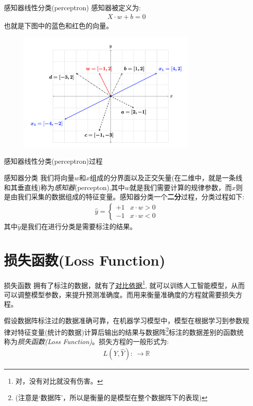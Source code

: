 \documentclass[handout]{ctexbeamer}
\newcommand{\rn}{\mathbb{R}}
\begin{document}
\begin{frame}{感知器线性分类(perceptron)}
感知器被定义为:
\begin{align*}
	X \cdot w + b = 0
\end{align*}	
也就是下图中的蓝色和红色的向量。
\begin{figure}[H]
	\centering
	\includegraphics[width=0.8\textwidth]{fig/C2C2dotprodt}
\end{figure}	
\end{frame}

\begin{frame}{感知器线性分类(perceptron)过程}
	\begin{block}{感知器分类}
	我们将向量$w$和$x$组成的分界面以及正交矢量(在二维中，就是一条线和其垂直线)称为\textit{感知器}(percepton),其中$w$就是我们需要计算的规律参数，而$x$则是由我们采集的数据组成的特征变量。感知器分类一个\textbf{二分}过程，分类过程如下:
	\begin{align*}
		\hat{y} = \begin{cases}
			+1 & x \cdot w > 0 \\
			-1 & x \cdot w < 0
		\end{cases}
	\end{align*}
	其中$\hat{y}$是我们在进行分类是需要标注的结果。	
	\end{block}

\end{frame}


\section{损失函数(Loss Function)}

\begin{frame}{损失函数}
拥有了标注的数据，就有了\underline{对比依据}\footnote[frame]{对，没有对比就没有伤害。}, 就可以训练人工智能模型，从而可以调整模型参数，来提升预测准确度。而用来衡量准确度的方程就需要损失方程。

\hfil

\begin{definition}
	假设数据阵标注过的数据准确可靠，在机器学习模型中，模型在根据学习到参数规律对特征变量(统计的数据)计算后输出的结果与数据阵\footnote{(注意是`数据阵'，所以是衡量的是模型在整个数据阵下的表现)}标注的数据差别的函数统称为\textit{损失函数(Loss Function)}。损失方程的一般形式为:
\begin{align*}
	L(Y, \hat{Y}): \ \to \rn 
\end{align*}	
\end{definition}
\end{frame}
\end{document}
